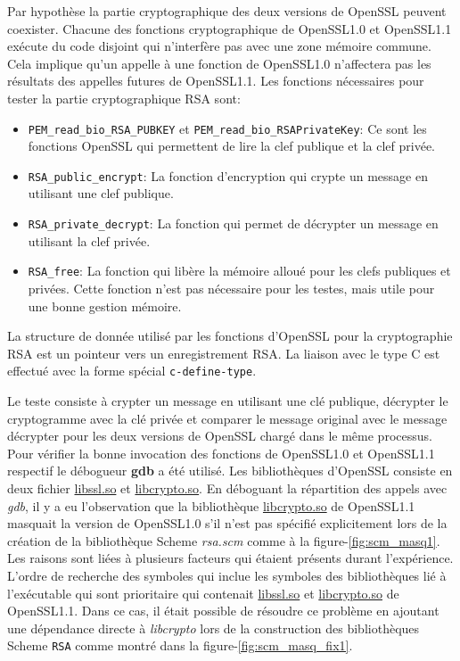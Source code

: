 \documentclass[12pt,initial,twoside,maitrise]{dms}
\numberwithin{equation}{section}
\numberwithin{table}{chapter}
\numberwithin{figure}{chapter}
\begin{document}
Par hypothèse la partie cryptographique des deux versions de OpenSSL peuvent
coexister. Chacune des fonctions cryptographique de OpenSSL1.0 et OpenSSL1.1
exécute du code disjoint qui n'interfère pas avec une zone mémoire commune.
Cela implique qu'un appelle à une fonction de OpenSSL1.0 n'affectera pas les
résultats des appelles futures de OpenSSL1.1. Les fonctions nécessaires
pour tester la partie cryptographique RSA sont:
\begin{itemize}
    \item \lstinline{PEM_read_bio_RSA_PUBKEY} et \lstinline{PEM_read_bio_RSAPrivateKey}:
        Ce sont les fonctions OpenSSL qui permettent de lire la clef publique et la clef privée.
    \item \lstinline{RSA_public_encrypt}:
        La fonction d'encryption qui crypte un  message en utilisant une clef publique.
    \item \lstinline{RSA_private_decrypt}:
        La fonction qui permet de décrypter un message en utilisant la clef privée.
    \item \lstinline{RSA_free}:
        La fonction qui libère la mémoire alloué pour les clefs publiques et privées.
        Cette fonction n'est pas nécessaire pour les testes, mais utile pour une bonne
        gestion mémoire.
\end{itemize}
La structure de donnée utilisé par les fonctions d'OpenSSL pour la cryptographie RSA
est un pointeur vers un enregistrement RSA. La liaison avec le type C est effectué avec
la forme spécial \lstinline{c-define-type}.

Le teste consiste à crypter un message en utilisant une clé publique, décrypter le
cryptogramme avec la clé privée et comparer le message original avec le message décrypter
pour les deux versions de OpenSSL chargé dans le même processus. Pour vérifier la bonne
invocation des fonctions de OpenSSL1.0 et OpenSSL1.1 respectif le débogueur \textbf{gdb}
a été utilisé. Les bibliothèques d'OpenSSL consiste en deux fichier \url{libssl.so} et \url{libcrypto.so}.
En déboguant la répartition des appels avec \textit{gdb}, il y a eu l'observation que
la bibliothèque \url{libcrypto.so} de OpenSSL1.1 masquait la version de OpenSSL1.0 s'il
n'est pas spécifié explicitement lors de la création de la bibliothèque Scheme \textit{rsa.scm}
comme à la figure-\ref{fig:scm_masq1}. Les raisons sont liées à plusieurs facteurs qui étaient présents
durant l'expérience. L'ordre de recherche des symboles qui inclue les symboles des bibliothèques lié à
l'exécutable qui sont prioritaire qui contenait \url{libssl.so} et \url{libcrypto.so} de OpenSSL1.1.
Dans ce cas, il était possible de résoudre ce problème en ajoutant une
dépendance directe à \textit{libcrypto} lors de la construction des bibliothèques Scheme \verb+RSA+
comme montré dans la figure-\ref{fig:scm_masq_fix1}.
\end{document}
